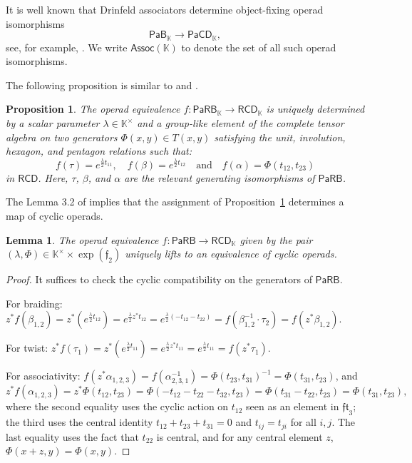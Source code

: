 \documentclass{amsart}
\newcommand{\kk}{\mathbb{K}}    %
\newcommand{\PaRB}{\mathsf{PaRB}}
\newcommand{\RCD}{\mathsf{RCD}}
\newcommand{\PaCD}{\mathsf{PaCD}}
\newcommand{\hRCD}{{\RCD}_{\kk}}
\newcommand{\hPaB}{{\PaB}_{\kk}}
\newcommand{\hPaCD}{{\PaCD}_{\kk}}
\newcommand{\hPaRB}{{\PaRB}_{\kk}}
\newcommand{\PaB}{\mathsf{PaB}}
\newcommand{\lrar}{\ensuremath{\longrightarrow}}
\newcommand{\Assoc}{\mathsf{Assoc}}
\newcommand{\ff}{\mathfrak{f}}
\newtheorem{prop}[theorem]{Proposition}%
\newtheorem{lemma}[theorem]{Lemma}%
\theoremstyle{definition}
\numberwithin{equation}{section}
\begin{document}
It is well known that Drinfeld associators determine object-fixing operad isomorphisms \[\hPaB \lrar \hPaCD,\] see, for example, \cite{BN, FresseBook1}. 
We write $\Assoc(\kk)$ to denote the set of all such operad isomorphisms. 


The following proposition is similar to \cite[Proposition 10.2.6; Theorem 10.2.9]{FresseBook1} and \cite[Section 5]{willwacher2024cyclic}.

\begin{prop}\label{prop: maps to RCD}
The operad equivalence $f: \hPaRB \rightarrow \hRCD$ is uniquely determined by a scalar parameter $\lambda\in\kk^{\times}$ and a group-like element of the complete tensor algebra on two generators $\Phi(x,y)\in T(x,y)$ satisfying the unit, involution, hexagon, and pentagon
relations such that:
\[f(\tau)=e^{\frac{\lambda}{2} t_{11}}, \quad f(\beta) = e^{\frac{\lambda}{2} t_{12}} \quad \text{and} \quad f(\alpha) = \Phi(t_{12}, t_{23})\]
in $\RCD$. Here, $\tau$, $\beta$, and $\alpha$ are the relevant generating isomorphisms of $\PaRB$.
\end{prop}

The Lemma 3.2 of \cite{willwacher2024cyclic} implies that the assignment of Proposition~\ref{prop: maps to RCD} determines a map of cyclic operads. 

\begin{lemma}
The operad equivalence $f:\PaRB \rightarrow \hRCD$ given by the pair $(\lambda, \Phi) \in \kk^{\times}\times \exp(\ff_2)$ uniquely lifts to an equivalence of cyclic operads. 
\end{lemma}

\begin{proof}
It suffices to check the cyclic compatibility on the generators of $\PaRB$.
    
For braiding: $z^*f(\beta_{1,2}) = z^*(e^{\frac{\lambda}{2} t_{12}}) = e^{\frac{\lambda}{2} z^* t_{12}} = e^{\frac{\lambda}{2} (-t_{12}- t_{22})} = f(\beta^{-1}_{1,2} \cdot \tau_2) = f(z^* \beta_{1,2}).$

For twist: $z^*f(\tau_{1}) = z^*(e^{\frac{\lambda}{2} t_{11}}) = e^{\frac{\lambda}{2} z^* t_{11}} = e^{\frac{\lambda}{2} t_{11}}  = f(z^* \tau_{1})$.
    
 For associativity: $f(z^*\alpha_{1,2,3}) = f(\alpha_{2,3,1}^{-1}) = \Phi(t_{23},t_{31})^{-1} =\Phi(t_{31}, t_{23})$, and \[z^*f(\alpha_{1,2,3}) = z^* \Phi(t_{12}, t_{23}) = \Phi(-t_{12}-t_{22}-t_{32} , t_{23}) = \Phi(t_{31}-t_{22}, t_{23}) = \Phi(t_{31}, t_{23}), \] where the second equality uses the cyclic action on $t_{12}$ seen as an element in $\mathfrak{ft}_3$; the third uses the central identity $t_{12}+t_{23}+t_{31} = 0$ and $t_{ij} = t_{ji}$ for all $i,j$. The last equality uses the fact that $t_{22}$ is central, and for any central element $z$, $\Phi(x+z,y) = \Phi(x,y)$.
\end{proof}
\end{document}

